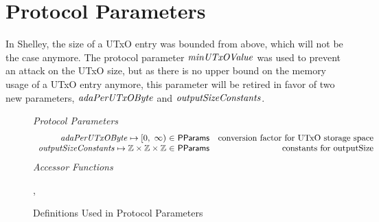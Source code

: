 \section{Protocol Parameters}

In Shelley, the size of a UTxO entry was bounded from above, which
will not be the case anymore. The protocol parameter
$\mathit{minUTxOValue}$ was used to prevent an attack on the UTxO size,
but as there is no upper bound on the memory usage of a UTxO entry
anymore, this parameter will be retired in favor of two new
parameters, $\mathit{adaPerUTxOByte}$ and $\mathit{outputSizeConstants}$.


\begin{figure*}[htb]
  \emph{Protocol Parameters}
  \begin{equation*}
      \begin{array}{r@{~\in~}lr}
        \var{adaPerUTxOByte} \mapsto \nonnegReals & \PParams & \text{conversion factor for UTxO storage space}\\
        \var{outputSizeConstants} \mapsto \Z \times \Z \times \Z & \PParams & \text{constants for outputSize}
      \end{array}
  \end{equation*}
  \emph{Accessor Functions}
  \begin{center}
    ,
  \end{center}
  \caption{Definitions Used in Protocol Parameters}
  \label{fig:defs:protocol-parameters}
\end{figure*}

